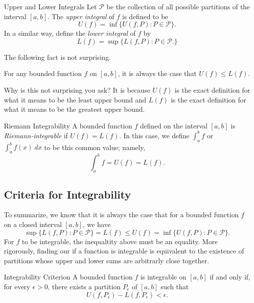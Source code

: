     \begin{definition}{Upper and Lower Integrals}{}
	Let \( \mathcal{P}  \) be the collection of all possible partitions of the interval \( [a,b] \). The \textit{upper integral} of \( f \) is defined to be 
	\[  U(f) = \inf \{ U(f,P) : P \in \mathcal{P} \}.  \]
	In a similar way, define the \textit{lower integral} of \( f  \) by 
	\[  L(f) = \sup \{ L(f,P) : P \in \mathcal{P}. \}  \]
\end{definition}
 The following fact is not surprising. 
\begin{lemma}
	For any bounded function \( f  \) on \( [a,b]  \), it is always the case that \( U(f) \leq L(f) \).
\end{lemma}
Why is this not surprising you ask? It is because \( U(f) \) is the exact definition for what it means to be the least upper bound and \( L(f)  \) is the exact definition for what it means to be the greatest upper bound.

\begin{definition}{Riemann Integrability}{}
	A bounded function \( f  \) defined on the interval \( [a,b] \) is \textit{Riemann-integrable} if \( U(f) = L(f) \). In this case, we define \( \int_{ a }^{ b } f   \) or \( \int_{ a }^{ b } f(x) \ dx \) to be this common value; namely, 
	\[  \int_{ a }^{ b } f  = U(f) = L(f). \]
	\end{definition}

\subsection{Criteria for Integrability} 

To summarize, we know that it is always the case that for a bounded function  \( f  \) on a closed interval \( [a,b]  \), we have 
\[  \sup \{ L(f,P) : P \in \mathcal{P} \} = L(f) \leq U(f) = \inf \{ U(f,P) : P \in \mathcal{P} \}.\] For \( f  \) to be integrable, the inequaltity above must be an equality. More rigorously, finding our if a function is integrable is equivalent to the existence of partitions whose upper and lower sums are arbitrarly close together.

\begin{theorem}{Integrability Criterion}{}
		A bounded function \(  f \) is integrable on \( [a,b]  \) if and only if, for every \( \epsilon > 0  \), there exists a partition \( P_{\epsilon } \) of \( [a,b] \) such that 
		\[  U(f, P_{\epsilon }) - L(f, P_{\epsilon }) < \epsilon. \]
	\end{theorem}


